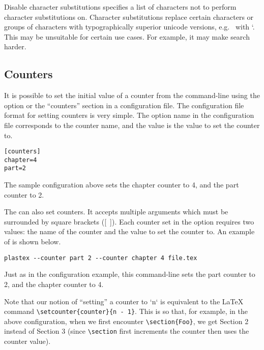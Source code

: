 \begin{configuration}{Disable character substitutions}
specifies a list of characters not to perform character substitutions on.
Character substitutions replace certain characters or groups of characters with
typographically superior unicode versions, e.g.\  with `. This may be
unsuitable for certain use cases. For example, it may make search harder.
\end{configuration}


\subsection{Counters}

It is possible to set the initial value of a counter from the
command-line using the  option or the
``counters'' section in a configuration file.  The configuration
file format for setting counters is very simple.  The option name
in the configuration file corresponds to the counter name, and the
value is the value to set the counter to.
\begin{verbatim}
[counters]
chapter=4
part=2
\end{verbatim}

The sample configuration above sets the chapter counter to 4, and the
part counter to 2.

The  can also set counters.  It accepts multiple
arguments which must be surrounded by square brackets ([~]).
Each counter set in the 
option requires two values: the name of the counter and the value to
set the counter to.  An example of  is shown below.
\begin{verbatim}
plastex --counter part 2 --counter chapter 4 file.tex
\end{verbatim}

Just as in the configuration example, this command-line sets the
part counter to 2, and the chapter counter to 4.

Note that our notion of ``setting'' a counter to `n` is equivalent to
the \LaTeX{} command \verb!\setcounter{counter}{n - 1}!. This is so that, for
example, in the above configuration, when we first encounter
\verb!\section{Foo}!, we get Section 2 instead of Section 3 (since
\verb!\section! first increments the counter then uses the counter value).

